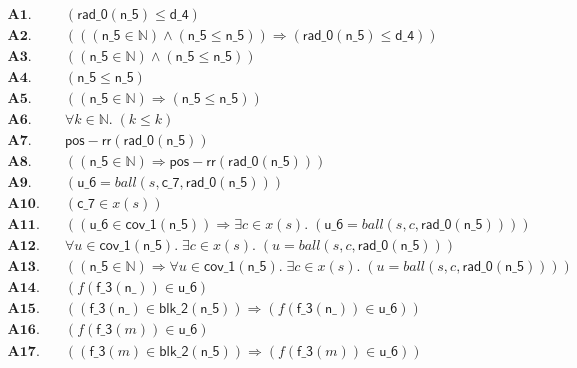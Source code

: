 \documentclass[11pt]{article}
\begin{document}
\begin{align*}
  \mathbf{A1.}\quad & (\mathsf{rad\_0}(\mathsf{n\_5}) \leq \mathsf{d\_4}) \\
  \mathbf{A2.}\quad & (((\mathsf{n\_5} \in \mathbb{N}) \wedge (\mathsf{n\_5} \leq \mathsf{n\_5})) \Rightarrow (\mathsf{rad\_0}(\mathsf{n\_5}) \leq \mathsf{d\_4})) \\
  \mathbf{A3.}\quad & ((\mathsf{n\_5} \in \mathbb{N}) \wedge (\mathsf{n\_5} \leq \mathsf{n\_5})) \\
  \mathbf{A4.}\quad & (\mathsf{n\_5} \leq \mathsf{n\_5}) \\
  \mathbf{A5.}\quad & ((\mathsf{n\_5} \in \mathbb{N}) \Rightarrow (\mathsf{n\_5} \leq \mathsf{n\_5})) \\
  \mathbf{A6.}\quad & \forall k \in \mathbb{N}.\; (k \leq k) \\
  \mathbf{A7.}\quad & \mathsf{pos{-}rr}(\mathsf{rad\_0}(\mathsf{n\_5})) \\
  \mathbf{A8.}\quad & ((\mathsf{n\_5} \in \mathbb{N}) \Rightarrow \mathsf{pos{-}rr}(\mathsf{rad\_0}(\mathsf{n\_5}))) \\
  \mathbf{A9.}\quad & (\mathsf{u\_6} = \mathit{ball}(s, \mathsf{c\_7}, \mathsf{rad\_0}(\mathsf{n\_5}))) \\
  \mathbf{A10.}\quad & (\mathsf{c\_7} \in x(s)) \\
  \mathbf{A11.}\quad & ((\mathsf{u\_6} \in \mathsf{cov\_1}(\mathsf{n\_5})) \Rightarrow \exists c \in x(s).\; (\mathsf{u\_6} = \mathit{ball}(s, c, \mathsf{rad\_0}(\mathsf{n\_5})))) \\
  \mathbf{A12.}\quad & \forall u \in \mathsf{cov\_1}(\mathsf{n\_5}).\; \exists c \in x(s).\; (u = \mathit{ball}(s, c, \mathsf{rad\_0}(\mathsf{n\_5}))) \\
  \mathbf{A13.}\quad & ((\mathsf{n\_5} \in \mathbb{N}) \Rightarrow \forall u \in \mathsf{cov\_1}(\mathsf{n\_5}).\; \exists c \in x(s).\; (u = \mathit{ball}(s, c, \mathsf{rad\_0}(\mathsf{n\_5})))) \\
  \mathbf{A14.}\quad & (f(\mathsf{f\_3}(\mathsf{n\_})) \in \mathsf{u\_6}) \\
  \mathbf{A15.}\quad & ((\mathsf{f\_3}(\mathsf{n\_}) \in \mathsf{blk\_2}(\mathsf{n\_5})) \Rightarrow (f(\mathsf{f\_3}(\mathsf{n\_})) \in \mathsf{u\_6})) \\
  \mathbf{A16.}\quad & (f(\mathsf{f\_3}(m)) \in \mathsf{u\_6}) \\
  \mathbf{A17.}\quad & ((\mathsf{f\_3}(m) \in \mathsf{blk\_2}(\mathsf{n\_5})) \Rightarrow (f(\mathsf{f\_3}(m)) \in \mathsf{u\_6})) \\

\end{align*}
\end{document}
